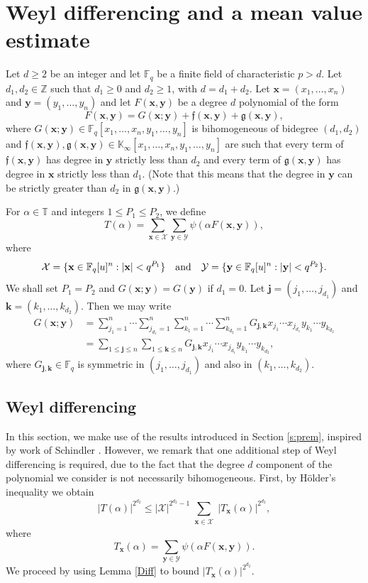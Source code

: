 \documentclass[12pt, reqno]{amsart}
\numberwithin{equation}{section}
\newcommand{\0}{\mathbf{0}}
\newcommand{\FF}{\mathbb{F}}
\newcommand{\ZZ}{\mathbb{Z}}
\newcommand{\TT}{\mathbb{T}}
\newcommand{\KK}{\mathbb{K}}
\renewcommand{\leq}{\leqslant}
\renewcommand{\geq}{\geqslant}
\newcommand{\x}{\mathbf{x}}
\newcommand{\y}{\mathbf{y}}
\renewcommand{\=}{\equiv}
\newcommand{\1}{\mathbf{1}}
\theoremstyle{definition}
\begin{document}
\section{Weyl differencing and a mean value estimate}
\label{sec:BHMG}


Let $d \geq 2$ be an integer and let 
 $\FF_q$ be a finite field of  characteristic $p>d$.
Let $d_1,d_2\in \ZZ$ such that $d_1\geq 0$ and $d_2\geq 1$, with $d = d_1 + d_2$.
Let 
$\x=(x_1, \ldots, x_n)$ and $\y=( y_1, \ldots, y_n)$ and let  $F(\x, \y)$
be a degree $d$ polynomial of the form
$$
F(\x, \y) = G (\x; \y)  + \mathfrak{f}(\x, \y) + \mathfrak{g}(\x, \y),
$$
where $G (\x; \y) \in \FF_q [x_1, \ldots, x_n, y_1, \ldots, y_n]$ is bihomogeneous of bidegree $(d_1, d_2)$ and
$\mathfrak{f}(\x, \y), \mathfrak{g}(\x, \y) \in \KK_\infty [x_1, \ldots, x_n, y_1, \ldots, y_n]$ are such that every term of $\mathfrak{f}(\x, \y)$  has degree in $\y$ strictly less than $d_2$ and every term of $\mathfrak{g}(\x, \y) $ has degree in $\x$ strictly less than $d_1$. (Note that this means that the degree in $\y$ can be strictly greater than $d_2$ in $\mathfrak{g}(\x,\y)$.)

For $\alpha \in \TT$ and integers $1 \leq P_1 \leq P_2$, we define
$$
T(\alpha) = \sum_{\x \in \mathcal{X}} \sum_{\y \in \mathcal{Y}}  \psi( \alpha F( \x, \y ) ),
$$
where
$$
\mathcal{X} = \{ \x \in \FF_q[u]^n:  |\x| < q^{P_1} \} \quad \textnormal{and} \quad  \mathcal{Y}  = \{ \y \in \FF_q[u]^n:  |\y| < q^{P_2} \}.
$$
We shall set $P_1 = P_2$ and $G(\x; \y) = G(\y)$ if $d_1 = 0$.
Let  $\mathbf{j} = (j_1, \ldots, j_{d_1})$ and $\mathbf{k} = (k_1, \ldots, k_{d_2})$. Then we may write 
\begin{align*}
G(\mathbf{x};\mathbf{y}) &= \sum_{j_1 = 1}^{n} \cdots \sum_{j_{d_1} = 1}^{n}
\sum_{k_1 = 1}^{n} \cdots \sum_{k_{d_2} = 1}^{n}
G_{\mathbf{j}, \mathbf{k}}  x_{j_1} \cdots x_{j_{d_1}} y_{k_1} \cdots y_{k_{d_2}}
\\
&= \sum_{1 \leq \mathbf{j} \leq n} \sum_{1 \leq \mathbf{k} \leq n}
G_{\mathbf{j}, \mathbf{k}}   x_{j_1} \cdots x_{ j_{d_1} }  y_{k_1} \cdots y_{ k_{d_2} },
\end{align*}
where  $G_{\mathbf{j}, \mathbf{k}} \in \FF_q$ is symmetric in $(j_1, \ldots, j_{d_1})$ and also in $(k_1, \ldots, k_{d_2})$.


\subsection{Weyl differencing} \label{sec:DIFF}
In this section, we make use of the results 
introduced in Section \ref{s:prem}, inspired by  work of Schindler \cite{DS}. However, we 
 remark that one additional step of Weyl differencing is required, 
 due to the fact that the degree $d$ component of the polynomial we consider is not necessarily bihomogeneous.
First, by H\"{o}lder's inequality we obtain
\begin{equation}
\label{ineq 1-1}
|T(\alpha)|^{ 2^{d_2} } \leq |\mathcal{X}|^{ 2^{d_2} - 1 } \sum_{ \substack{ \x  \in \mathcal{X} }}
| T_{\x} ({\alpha}) |^{2^{d_2 }},
\end{equation}
where
$$
T_{\x} (\alpha) = \sum_{ \y  \in \mathcal{Y} } \psi( \alpha F( \x, \y ) ).
$$
We proceed by using Lemma \ref{Diff} to bound $| T_{\mathbf{x}} (\alpha) |^{2^{d_2}}$.
\end{document}
